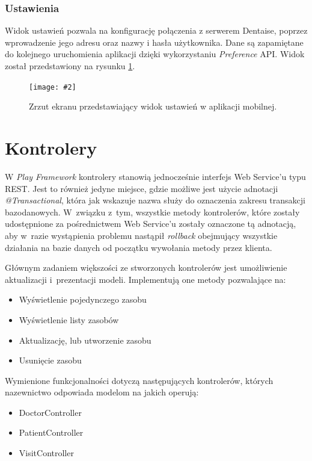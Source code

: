 \documentclass[11pt]{aghdpl}
\newcommand{\customWidthPicture}[3]{
\begin{figure}[h!]
	\centering
		\texttt{[image: \#2]}
	\caption{#3}
	\label{fig:#2}
\end{figure}
}
\begin{document}
\subsubsection{Ustawienia}
\label{sec:ustawieniaMobile}

Widok ustawień pozwala na konfigurację połączenia z serwerem Dentaise, poprzez wprowadzenie jego adresu oraz nazwy i hasła użytkownika. Dane są zapamiętane do kolejnego uruchomienia aplikacji dzięki wykorzystaniu \emph{Preference} API. Widok został przedstawiony na rysunku \ref{fig:ustawieniaMobile}.

\customWidthPicture{.3}{ustawieniaMobile}{Zrzut ekranu przedstawiający widok ustawień w aplikacji mobilnej.}

\section{Kontrolery}

W \emph{Play Framework} kontrolery stanowią jednocześnie interfejs Web Service'u typu REST. Jest to również jedyne miejsce, gdzie możliwe jest użycie adnotacji \emph{@Transactional}, która jak wskazuje nazwa służy do oznaczenia zakresu transakcji bazodanowych. W~związku z~tym, wszystkie metody kontrolerów, które zostały udostępnione za pośrednictwem Web Service'u zostały oznaczone tą adnotacją, aby w~razie wystąpienia problemu nastąpił \emph{rollback} obejmujący wszystkie działania na bazie danych od początku wywołania metody przez klienta.

Głównym zadaniem większości ze stworzonych kontrolerów jest umożliwienie aktualizacji i~prezentacji modeli. Implementują one metody pozwalające na:

\begin{itemize}
	\item Wyświetlenie pojedynczego zasobu
	\item Wyświetlenie listy zasobów
	\item Aktualizację, lub utworzenie zasobu
	\item Usunięcie zasobu
\end{itemize}

Wymienione funkcjonalności dotyczą następujących kontrolerów, których nazewnictwo odpowiada modelom na jakich operują:

\begin{itemize}
	\item DoctorController
	\item PatientController
	\item VisitController
\end{itemize}
\end{document}
